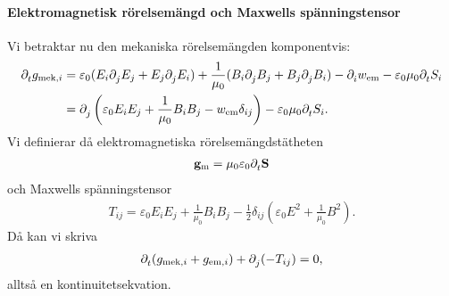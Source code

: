 \paragraph{Elektromagnetisk rörelsemängd och Maxwells spänningstensor}
Vi betraktar nu den mekaniska rörelsemängden komponentvis:
\begin{align*}
	\partial_{t}^{}g_{\text{mek}, i} &= \varepsilon_{0}(E_{i}\partial_{j}^{}E_{j} + E_{j}\partial_{j}^{}E_{i}) + \frac{1}{\mu_{0}}(B_{i}\partial_{j}^{}B_{j} + B_{j}\partial_{j}^{}B_{i}) - \partial_{i}^{}w_{\text{em}} - \varepsilon_{0}\mu_{0}\partial_{t}^{}S_{i} \\
	                                &= \partial_{j}^{}\left(\varepsilon_{0}E_{i}E_{j} + \frac{1}{\mu_{0}}B_{i}B_{j} - w_{\text{em}}\delta_{ij}\right) - \varepsilon_{0}\mu_{0}\partial_{t}^{}S_{i}.
\end{align*}
Vi definierar då elektromagnetiska rörelsemängdstätheten
\begin{align*}
	\vb{g}_{\text{m}} = \mu_{0}\varepsilon_{0}\partial_{t}^{}\vb{S}
\end{align*}
och Maxwells spänningstensor
\begin{align*}
	T_{ij} = \varepsilon_{0}E_{i}E_{j} + \frac{1}{\mu_{0}}B_{i}B_{j} - \frac{1}{2}\delta_{ij}\left(\varepsilon_{0}E^{2} + \frac{1}{\mu_{0}}B^{2}\right).
\end{align*}
Då kan vi skriva
\begin{align*}
	\partial_{t}^{}(g_{\text{mek}, i} + g_{\text{em}, i}) + \partial_{j}^{}(-T_{ij}) = 0,
\end{align*}
alltså en kontinuitetsekvation.

